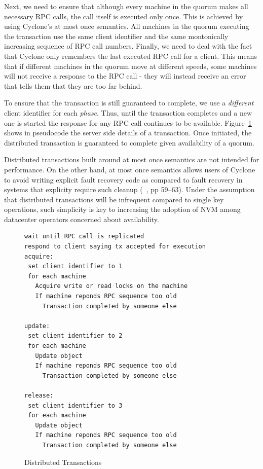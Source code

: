 \documentclass[10pt, preprint]{sigplanconf}
\begin{document}
Next, we need to ensure that although every machine in the quorum makes all
necessary RPC calls, the call itself is executed only once. This is achieved by
using Cyclone's at most once semantics. All machines in the quorum executing the
transaction use the same client identifier and the same montonically increasing
sequence of RPC call numbers. Finally, we need to deal with the fact that
Cyclone only remembers the last executed RPC call for a client. This means that
if different machines in the quorum move at different speeds, some machines will
not receive a response to the RPC call - they will instead receive an error that
tells them that they are too far behind.

To ensure that the transaction is still guaranteed to complete, we use a
\emph{different} client identifier for each \emph{phase}. Thus, until the
transaction completes and a new one is started the response for any RPC call
continues to be available. Figure~\ref{fig:dist_tx} shows in pseudocode the
server side details of a transaction. Once initiated, the distributed transaction
is guaranteed to complete given availability of a quorum.

Distributed transactions built around at most once semantics are not intended
for performance. On the other hand, at most once semantics allows users of
Cyclone to avoid writing explicit fault recovery code as compared to fault
recovery in systems that explicity require such cleanup (~\cite{farm}, pp
59--63). Under the assumption that distributed transactions will be infrequent
compared to single key operations, such simplicity is key to increasing the
adoption of NVM among datacenter operators concerned about availability. 

\begin{figure}
{ \scriptsize
\begin{verbatim}
wait until RPC call is replicated
respond to client saying tx accepted for execution
acquire:
 set client identifier to 1
 for each machine
   Acquire write or read locks on the machine
   If machine reponds RPC sequence too old
     Transaction completed by someone else

update:
 set client identifier to 2
 for each machine
   Update object
   If machine reponds RPC sequence too old
     Transaction completed by someone else
 
release:
 set client identifier to 3
 for each machine
   Update object
   If machine reponds RPC sequence too old
     Transaction completed by someone else
\end{verbatim}
}
\vspace{-0.22in}
\caption{Distributed Transactions}
\label{fig:dist_tx}
\end{figure}
\end{document}
